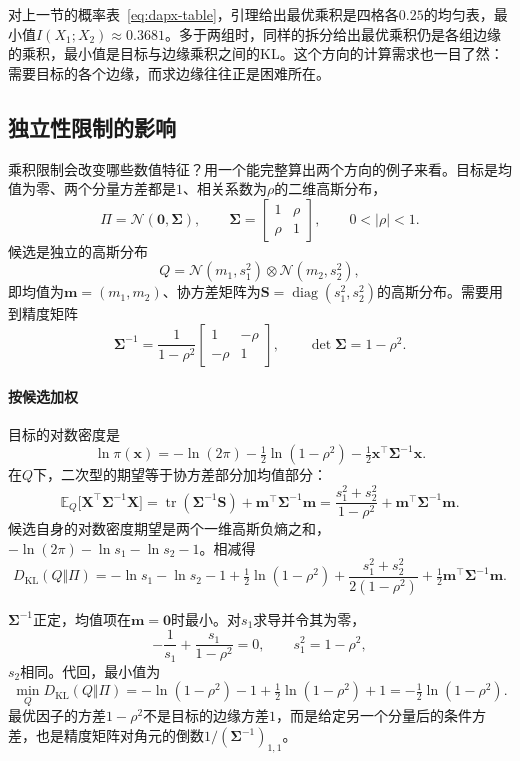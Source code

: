 对上一节的概率表~\eqref{eq:dapx-table}，引理给出最优乘积是四格各$0.25$的均匀表，最小值$I(X_1;X_2)\approx0.3681$。多于两组时，同样的拆分给出最优乘积仍是各组边缘的乘积，最小值是目标与边缘乘积之间的KL。这个方向的计算需求也一目了然：需要目标的各个边缘，而求边缘往往正是困难所在。

\subsection{独立性限制的影响}
\label{sec:dapx-independence}

乘积限制会改变哪些数值特征？用一个能完整算出两个方向的例子来看。目标是均值为零、两个分量方差都是$1$、相关系数为$\rho$的二维高斯分布，
\begin{equation}
 \Pi=\mathcal{N}(\bm{0},\bm{\Sigma}),\qquad \bm{\Sigma}=\begin{bmatrix}1&\rho\\\rho&1\end{bmatrix},\qquad 0<\lvert\rho\rvert<1 .
 \label{eq:dapx-gauss-target}
\end{equation}
候选是独立的高斯分布
\[
 Q=\mathcal{N}(m_1,s_1^{2})\otimes\mathcal{N}(m_2,s_2^{2}) ,
\]
即均值为$\bm{m}=(m_1,m_2)$、协方差矩阵为$\bm{S}=\operatorname{diag}(s_1^{2},s_2^{2})$的高斯分布。需要用到精度矩阵
\[
 \bm{\Sigma}^{-1}=\frac{1}{1-\rho^{2}}\begin{bmatrix}1&-\rho\\-\rho&1\end{bmatrix},\qquad \det\bm{\Sigma}=1-\rho^{2} .
\]

\paragraph{按候选加权}
目标的对数密度是
\[
 \ln\pi(\bm{x})=-\ln(2\pi)-\tfrac12\ln(1-\rho^{2})-\tfrac12\bm{x}^{\top}\bm{\Sigma}^{-1}\bm{x} .
\]
在$Q$下，二次型的期望等于协方差部分加均值部分：
\[
 \mathbb{E}_{Q}\bigl[\bm{X}^{\top}\bm{\Sigma}^{-1}\bm{X}\bigr]=\operatorname{tr}(\bm{\Sigma}^{-1}\bm{S})+\bm{m}^{\top}\bm{\Sigma}^{-1}\bm{m}=\frac{s_1^{2}+s_2^{2}}{1-\rho^{2}}+\bm{m}^{\top}\bm{\Sigma}^{-1}\bm{m} .
\]
候选自身的对数密度期望是两个一维高斯负熵之和，$-\ln(2\pi)-\ln s_1-\ln s_2-1$。相减得
\[
 D_{\mathrm{KL}}(Q\Vert\Pi)=-\ln s_1-\ln s_2-1+\tfrac12\ln(1-\rho^{2})+\frac{s_1^{2}+s_2^{2}}{2(1-\rho^{2})}+\tfrac12\bm{m}^{\top}\bm{\Sigma}^{-1}\bm{m} .
\]

$\bm{\Sigma}^{-1}$正定，均值项在$\bm{m}=\bm{0}$时最小。对$s_1$求导并令其为零，
\[
 -\frac{1}{s_1}+\frac{s_1}{1-\rho^{2}}=0,\qquad s_1^{2}=1-\rho^{2} ,
\]
$s_2$相同。代回，最小值为
\begin{equation}
 \min_{Q}D_{\mathrm{KL}}(Q\Vert\Pi)=-\ln(1-\rho^{2})-1+\tfrac12\ln(1-\rho^{2})+1=-\tfrac12\ln(1-\rho^{2}) .
 \label{eq:dapx-gauss-reverse}
\end{equation}
最优因子的方差$1-\rho^{2}$不是目标的边缘方差$1$，而是给定另一个分量后的条件方差，也是精度矩阵对角元的倒数$1/(\bm{\Sigma}^{-1})_{1,1}$。

